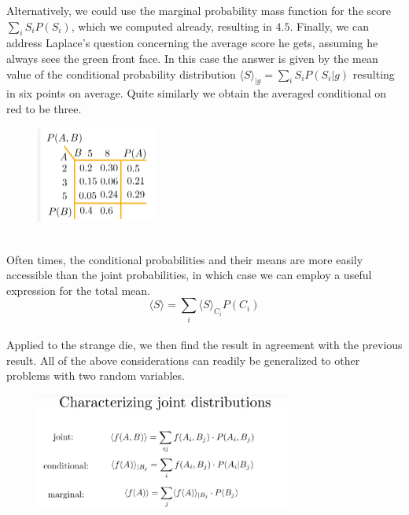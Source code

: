 \documentclass[12pt, a4paper]{scrartcl}
\begin{document}
Alternatively, we could use the marginal probability mass function for the score $\sum_iS_iP(S_i)$, which we computed already, resulting in $4.5$.
Finally, we can address Laplace’s question concerning the average score he gets, assuming he always sees the green front face. In this case the answer is given by the mean value of the conditional probability distribution $\langle S \rangle _{|g} = \sum_iS_iP(S_i|g)$ resulting in six points on average.
Quite similarly we obtain the averaged conditional on red to be three.\\
\begin{figure}[H]
	\centering
	\includegraphics[width=0.35\textwidth]{3_9.png}
\end{figure}
\\
Often times, the conditional probabilities and their means are more easily accessible than the joint probabilities, in which case we can employ a useful expression for the total mean.
\begin{equation*}\boxed{\langle S\rangle= \sum_{i}\langle S\rangle_{C_i}P(C_i)}\end{equation*}\\
Applied to the strange die, we then find the result in agreement with the previous result.
All of the above considerations can readily be generalized to other problems with two random variables.\\%
\begin{figure}[H]
	\centering
	\includegraphics[width=0.75\textwidth]{3_10.png}
\end{figure}
\end{document}
